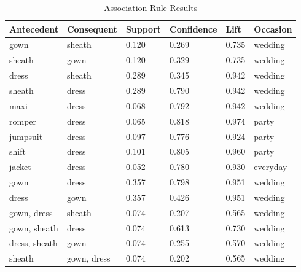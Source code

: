 \documentclass[sigconf]{acmart}
\begin{document}
\begin{table}[ht]
\caption{Association Rule Results} %
\centering %
\begin{tabular}{p{1.2cm} p{1.4cm} p{1cm} p{1.3cm} p{0.8cm} p} %
\hline\hline %
Antecedent & Consequent & Support & Confidence & Lift & Occasion \\ [0.5ex] %
\hline %
gown & sheath & 0.120 & 0.269 & 0.735 & wedding\\\hline
sheath & gown & 0.120 & 0.329 & 0.735 & wedding\\ \hline
dress & sheath & 0.289 & 0.345 & 0.942 & wedding\\ \hline
sheath & dress & 0.289 & 0.790 & 0.942 & wedding\\ \hline
maxi & dress & 0.068 & 0.792 & 0.942 & wedding\\ \hline
romper & dress & 0.065 & 0.818 & 0.974 & party\\ \hline
jumpsuit & dress & 0.097 & 0.776 & 0.924 & party\\ \hline
shift & dress & 0.101 & 0.805 & 0.960 & party\\ \hline
jacket & dress & 0.052 & 0.780 & 0.930 & everyday\\\hline
gown & dress & 0.357 & 0.798 & 0.951 & wedding\\ \hline
dress & gown & 0.357 & 0.426 & 0.951 & wedding\\ \hline
gown, dress & sheath & 0.074 & 0.207 & 0.565 & wedding\\\hline 
gown, sheath & dress & 0.074 & 0.613 & 0.730 & wedding\\\hline
dress, sheath & gown & 0.074 & 0.255 & 0.570 & wedding\\ \hline
sheath & gown, dress & 0.074 & 0.202 & 0.565 & wedding\\
[1ex] %
\hline %
\end{tabular}
\label{tab_3} %
\end{table}
\end{document}
